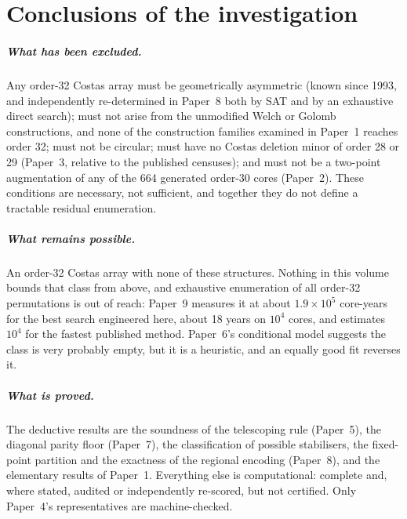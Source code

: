 
\chapter*{Conclusions of the investigation}

\paragraph{What has been excluded.} Any order-32 Costas array must be geometrically asymmetric
(known since 1993, and independently re-determined in Paper~8 both by SAT and by an exhaustive direct
search); must not arise from the unmodified Welch
or Golomb constructions, and none of the construction families examined in Paper~1 reaches order
32; must not be circular; must have no Costas deletion minor of order 28 or 29 (Paper~3, relative to
the published censuses); and must not be a two-point augmentation of any of the 664 generated
order-30 cores (Paper~2). These conditions are necessary, not sufficient, and together they do not
define a tractable residual enumeration.

\paragraph{What remains possible.} An order-32 Costas array with none of these structures. Nothing in
this volume bounds that class from above, and exhaustive enumeration of all order-32 permutations
is out of reach: Paper~9 measures it at about $1.9\times10^5$ core-years for the best search engineered here, about 18
years on $10^4$ cores, and
estimates $10^4$ for the fastest published method. Paper~6's conditional model suggests the class is very probably empty, but it is a
heuristic, and an equally good fit reverses it.

\paragraph{What is proved.} The deductive results are the soundness of the telescoping rule
(Paper~5), the diagonal parity floor (Paper~7), the classification of possible stabilisers, the
fixed-point partition and the exactness of the regional encoding (Paper~8), and the elementary
results of Paper~1. Everything else is computational: complete and, where stated, audited or
independently re-scored, but not certified. Only Paper~4's representatives are machine-checked.

